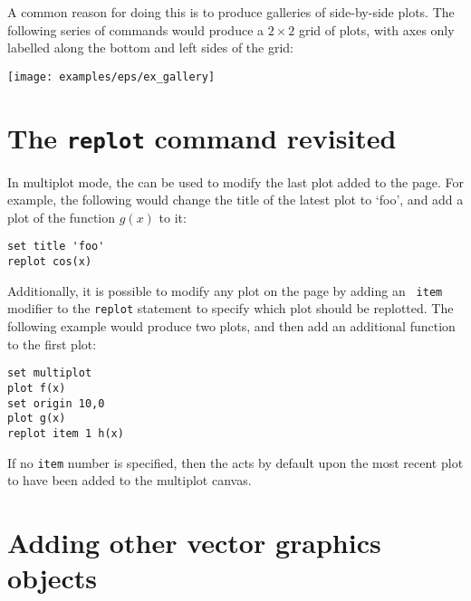 A common reason for doing this is to produce galleries of side-by-side plots.
The following series of commands would produce a $2\times2$ grid of plots, with
axes only labelled along the bottom and left sides of the grid:

\vspace{3mm}

\vspace{3mm}

\centerline{\texttt{[image: examples/eps/ex\_gallery]}}

\section{The {\tt replot} command revisited}

In multiplot mode, the  can be used to modify the last plot
added to the page. For example, the following would change the title of the
latest plot to `foo', and add a plot of the function $g(x)$ to it:

\begin{verbatim}
set title 'foo'
replot cos(x)
\end{verbatim}

Additionally, it is possible to modify any plot on the page by adding an {\tt
item} modifier to the {\tt replot} statement to specify which plot should be
replotted.  The following example would produce two plots, and then add an
additional function to the first plot:

\begin{verbatim}
set multiplot
plot f(x)
set origin 10,0
plot g(x)
replot item 1 h(x)
\end{verbatim}

If no {\tt item} number is specified, then the  acts by default
upon the most recent plot to have been added to the multiplot canvas.

\section{Adding other vector graphics objects}

